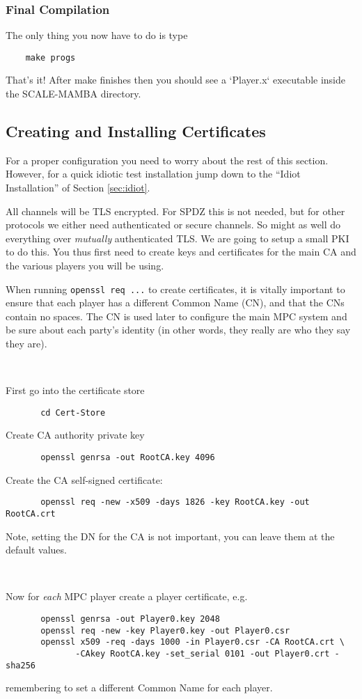 \subsubsection{Final Compilation}
The only thing you now have to do is type
\begin{verbatim}
    make progs
\end{verbatim}
That's it! After make finishes then you should see a `Player.x`
executable inside the SCALE-MAMBA directory.



\subsection{Creating and Installing Certificates}
For a proper configuration you need to worry about the rest
of this section. 
However, for a quick idiotic test installation jump down to the ``Idiot 
Installation'' of Section \ref{sec:idiot}.

All channels will be TLS encrypted. For SPDZ this is not needed, but for
other protocols we either need authenticated or secure channels. So might
as well do everything over {\em mutually} authenticated TLS. We are going
to setup a small PKI to do this. You thus first need to create
keys and certificates for the main CA and the various players you
will be using.

When running \verb+openssl req ...+ to create certificates, it is
vitally important to ensure that each player has a different Common
Name (CN), and that the CNs contain no spaces.  The CN is used later
to configure the main MPC system and be sure about each party's
identity (in other words, they really are who they say they are).

~~

\noindent
First go into the certificate store
\begin{verbatim}
       cd Cert-Store
\end{verbatim}
Create CA authority private key
\begin{verbatim}
       openssl genrsa -out RootCA.key 4096
\end{verbatim}
Create the CA self-signed certificate:
\begin{verbatim}
       openssl req -new -x509 -days 1826 -key RootCA.key -out RootCA.crt
\end{verbatim}
Note, setting the DN for the CA is not important, you can leave them
at the default values.

~~

\noindent
Now for {\em each} MPC player create a player certificate, e.g.
\begin{verbatim}
       openssl genrsa -out Player0.key 2048
       openssl req -new -key Player0.key -out Player0.csr
       openssl x509 -req -days 1000 -in Player0.csr -CA RootCA.crt \
              -CAkey RootCA.key -set_serial 0101 -out Player0.crt -sha256
\end{verbatim}
remembering to set a different Common Name for each player.

